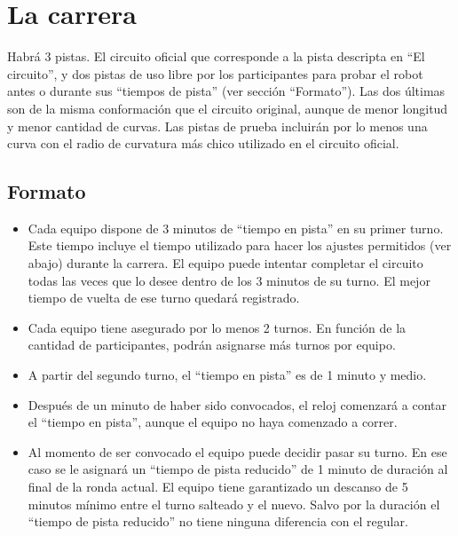\documentclass[a4paper,11pt]{article}
\begin{document}
\section*{La carrera}
Habrá 3 pistas. El circuito oficial que corresponde a la pista descripta en
``El circuito'', y dos pistas de uso libre por los participantes para probar el
robot antes o durante sus ``tiempos de pista'' (ver sección ``Formato''). Las
dos últimas son de la misma conformación que el circuito original, aunque de
menor longitud y menor cantidad de curvas. Las pistas de prueba incluirán por
lo menos una curva con el radio de curvatura más chico utilizado en el circuito
oficial.

\subsection*{Formato}
\begin{itemize}
  \item Cada equipo dispone de 3 minutos de ``tiempo en pista'' en su primer turno. Este tiempo incluye el tiempo utilizado para hacer los ajustes permitidos (ver abajo) durante la carrera. El equipo puede intentar completar el circuito todas las veces que lo desee dentro de los 3 minutos de su turno.  El mejor tiempo de vuelta de ese turno quedará registrado.
  \item Cada equipo tiene asegurado por lo menos 2 turnos. En función de la cantidad de participantes, podrán asignarse más turnos por equipo.
  \item A partir del segundo turno, el ``tiempo en pista'' es de 1 minuto y medio.
  \item Después de un minuto de haber sido convocados, el reloj comenzará a contar el ``tiempo en pista'', aunque el equipo no haya comenzado a correr.
  \item Al momento de ser convocado el equipo puede decidir pasar su turno. En ese caso se le asignará un ``tiempo de pista reducido'' de 1 minuto de duración al final de la ronda actual. El equipo tiene garantizado un descanso de 5 minutos mínimo entre el turno salteado y el nuevo. Salvo por la duración el ``tiempo de pista reducido'' no tiene ninguna diferencia con el regular.
\end{itemize}    
\end{document}
